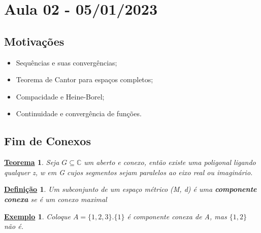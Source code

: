 \documentclass{article}
\newtheorem*{def*}{\underline{Defini\c c\~ao}}
\newtheorem*{theorem*}{\underline{Teorema}}
\newtheorem{example}{\underline{Exemplo}}[section]
\begin{document}
  \section{Aula 02 - 05/01/2023}
  \subsection{Motiva\c c\~oes}
  \begin{itemize}
    \item Sequ\^encias e suas converg\^encias;
    \item Teorema de Cantor para espa\c cos completos;
    \item Compacidade e Heine-Borel;
    \item Continuidade e converg\^encia de fun\c c\~oes.
  \end{itemize}

  \subsection{Fim de Conexos}
  \begin{theorem*}
    Seja $G\subseteq{\mathbb{C}}$ um aberto e conexo, ent\~ao existe uma poligonal ligando qualquer z, w em G cujos segmentos
    sejam paralelos ao eixo real ou imagin\'ario.
  \end{theorem*}

  \begin{def*}
    Um subconjunto de um espa\c co m\'etrico (M, d) \'e uma \textbf{componente conexa} se \'e um conexo maximal
  \end{def*}

  \begin{example}
    Coloque $A = \{1, 2, 3\}. \{1\}$ \'e componente conexa de A, mas $\{1, 2\}$ n\~ao \'e. 
  \end{example}
\end{document}
